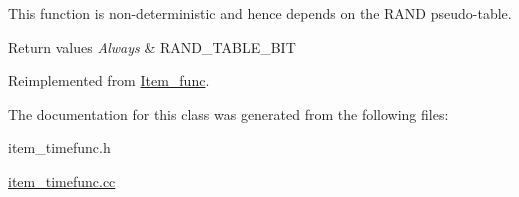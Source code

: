This function is non-\/deterministic and hence depends on the \textquotesingle{}R\+A\+ND\textquotesingle{} pseudo-\/table.


\begin{DoxyRetVals}{Return values}
{\em Always} & R\+A\+N\+D\+\_\+\+T\+A\+B\+L\+E\+\_\+\+B\+IT \\
\hline
\end{DoxyRetVals}


Reimplemented from \mbox{\hyperlink{classItem__func_a379f54a79ca65beebc1e2571f3bf0d35}{Item\+\_\+func}}.



The documentation for this class was generated from the following files\+:\begin{DoxyCompactItemize}
\item 
item\+\_\+timefunc.\+h\item 
\mbox{\hyperlink{item__timefunc_8cc}{item\+\_\+timefunc.\+cc}}\end{DoxyCompactItemize}

